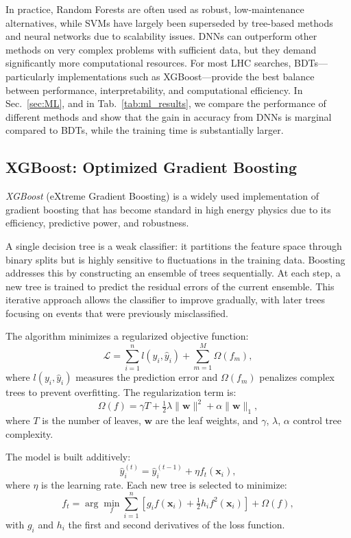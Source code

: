 In practice, Random Forests are often used as robust, low-maintenance alternatives, while SVMs have largely been superseded by tree-based methods and neural networks due to scalability issues. DNNs can outperform other methods on very complex problems with sufficient data, but they demand significantly more computational resources. For most LHC searches, BDTs—particularly implementations such as XGBoost—provide the best balance between performance, interpretability, and computational efficiency. In Sec.~\ref{sec:ML}, and in Tab.~\ref{tab:ml_results}, we compare the performance of different methods and show that the gain in accuracy from DNNs is marginal compared to BDTs, while the training time is substantially larger.


\subsection{XGBoost: Optimized Gradient Boosting}
\label{ssec:xgboost}

\textit{XGBoost} (eXtreme Gradient Boosting) is a widely used implementation of gradient boosting that has become standard in high energy physics due to its efficiency, predictive power, and robustness. 

A single decision tree is a weak classifier: it partitions the feature space through binary splits but is highly sensitive to fluctuations in the training data. Boosting addresses this by constructing an ensemble of trees sequentially. At each step, a new tree is trained to predict the residual errors of the current ensemble. This iterative approach allows the classifier to improve gradually, with later trees focusing on events that were previously misclassified.

The algorithm minimizes a regularized objective function:
\begin{equation}
\mathcal{L} = \sum_{i=1}^{n} l(y_i, \hat{y}_i) + \sum_{m=1}^{M} \Omega(f_m),
\end{equation}
where $l(y_i, \hat{y}_i)$ measures the prediction error and $\Omega(f_m)$ penalizes complex trees to prevent overfitting. The regularization term is:
\begin{equation}
\Omega(f) = \gamma T + \tfrac{1}{2}\lambda \|\mathbf{w}\|^2 + \alpha \|\mathbf{w}\|_1,
\end{equation}
where $T$ is the number of leaves, $\mathbf{w}$ are the leaf weights, and $\gamma$, $\lambda$, $\alpha$ control tree complexity.

The model is built additively:
\begin{equation}
\hat{y}_i^{(t)} = \hat{y}_i^{(t-1)} + \eta f_t(\mathbf{x}_i),
\end{equation}
where $\eta$ is the learning rate. Each new tree is selected to minimize:
\begin{equation}
f_t = \arg\min_{f} \sum_{i=1}^{n} \left[g_i f(\mathbf{x}_i) + \tfrac{1}{2} h_i f^2(\mathbf{x}_i)\right] + \Omega(f),
\end{equation}
with $g_i$ and $h_i$ the first and second derivatives of the loss function.

